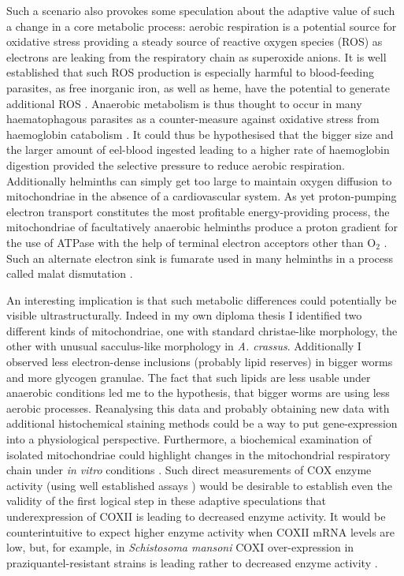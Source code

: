 Such a scenario also provokes some speculation about the adaptive
value of such a change in a core metabolic process: aerobic
respiration is a potential source for oxidative stress providing a
steady source of reactive oxygen species (ROS) as electrons are
leaking from the respiratory chain as superoxide anions. It is well
established that such ROS production is especially harmful to
blood-feeding parasites, as free inorganic iron, as well as heme, have
the potential to generate additional ROS
\cite{pmid21087517}. Anaerobic metabolism is thus thought to occur in
many haematophagous parasites as a counter-measure against oxidative
stress from haemoglobin catabolism \cite{pmid12163151}. It could thus
be hypothesised that the bigger size and the larger amount of
eel-blood ingested leading to a higher rate of haemoglobin digestion
provided the selective pressure to reduce aerobic
respiration. Additionally helminths can simply get too large to
maintain oxygen diffusion to mitochondriae in the absence of a
cardiovascular system. As yet proton-pumping electron transport
constitutes the most profitable energy-providing process, the
mitochondriae of facultatively anaerobic helminths produce a proton
gradient for the use of ATPase with the help of terminal electron
acceptors other than O$_2$ \cite{pmid12417132}. Such an alternate
electron sink is fumarate used in many helminths in a process called
malat dismutation \cite{pmid15275412}.

An interesting implication is that such metabolic differences could
potentially be visible ultrastructurally. Indeed in my own diploma
thesis \cite{heitlinger_vergleichende_2008} I identified two different
kinds of mitochondriae, one with standard christae-like morphology,
the other with unusual sacculus-like morphology in
\textit{A. crassus}. Additionally I observed less electron-dense
inclusions (probably lipid reserves) in bigger worms and more glycogen
granulae. The fact that such lipids are less usable under anaerobic
conditions led me to the hypothesis, that bigger worms are using less
aerobic processes. Reanalysing this data and probably obtaining new
data with additional histochemical staining methods could be a way to
put gene-expression into a physiological perspective. Furthermore, a
biochemical examination of isolated mitochondriae could highlight
changes in the mitochondrial respiratory chain under \textit{in vitro}
conditions \cite{pmid18314717}. Such direct measurements of COX enzyme
activity (using well established assays \cite{pmid8592440}) would be
desirable to establish even the validity of the first logical step in
these adaptive speculations that underexpression of COXII is leading
to decreased enzyme activity. It would be counterintuitive to expect
higher enzyme activity when COXII mRNA levels are low, but, for
example, in \textit{Schistosoma mansoni} COXI over-expression in
praziquantel-resistant strains is leading rather to decreased enzyme
activity \cite{pmid9695101}.

